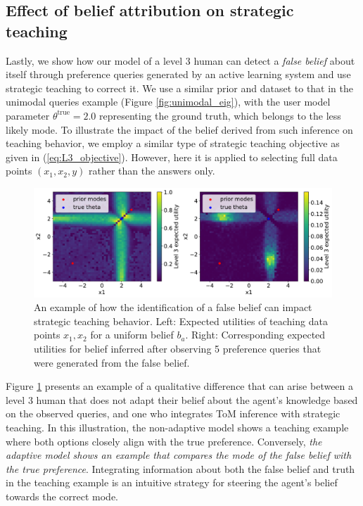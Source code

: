 \documentclass[letterpaper]{article} %
\begin{document}
\subsection{Effect of belief attribution on strategic teaching}

Lastly, we show how our model of a level 3 human can detect a \textit{false belief} about itself through preference queries generated by an active learning system and use strategic teaching to correct it. We use a similar prior and dataset to that in the unimodal queries example (Figure \ref{fig:unimodal_eig}), with the user model parameter $\theta^{\text{true}}=2.0$ representing the ground truth, which belongs to the less likely mode. To illustrate the impact of the belief derived from such inference on teaching behavior, we employ a similar type of strategic teaching objective as given in (\ref{eq:L3_objective}). However, here it is applied to selecting full data points $(x_1, x_2, y)$ rather than the answers only.

\begin{figure}[t]
\centering
\includegraphics[width=1.0\columnwidth]{belief_correction_3.pdf}
\caption{An example of how the identification of a false belief can impact strategic teaching behavior. Left: Expected utilities of teaching data points $x_1, x_2$ for a uniform belief $b_a$. Right: Corresponding expected utilities for belief inferred after observing 5 preference queries that were generated from the false belief.}
\label{fig:belief_correction}
\end{figure}

Figure \ref{fig:belief_correction} presents an example of a qualitative difference that can arise between a level 3 human that does not adapt their belief about the agent's knowledge based on the observed queries, and one who integrates ToM inference with strategic teaching. In this illustration, the non-adaptive model shows a teaching example where both options closely align with the true preference. Conversely, \textit{the adaptive model shows an example that compares the mode of the false belief with the true preference}. Integrating information about both the false belief and truth in the teaching example is an intuitive strategy for steering the agent's belief towards the correct mode.
\end{document}
